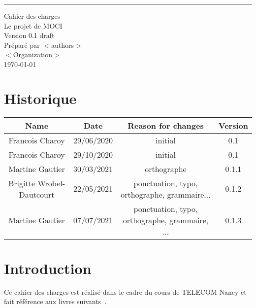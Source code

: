 \documentclass{scrreprt}
\date{}
\def\myversion{0.1 }
\begin{document}
\renewcommand*{\glsclearpage}{}
\begin{center}
    \rule{16cm}{5pt}\vskip1cm
    \begin{bfseries}
        \Huge{Cahier des charges}\\
        \vspace{1.9cm}
        Le projet de MOCI\\
        \vspace{1.9cm}
        \LARGE{Version \myversion draft}\\
        \vspace{1.9cm}
        Préparé par $<$authors$>$\\
        \vspace{1.9cm}
        $<$Organization$>$\\
        \vspace{1.9cm}
        \today\\
    \end{bfseries}
\end{center}

\tableofcontents

\chapter*{Historique}

\begin{center}
    \begin{tabular}{|c|c|c|c|}
        \hline
	    Name & Date & Reason for changes & Version\\
        \hline
	    Francois Charoy & 29/06/2020 & initial & 0.1\\
        \hline
	    Francois Charoy & 29/10/2020 & initial & 0.1\\
        \hline
	    Martine Gautier & 30/03/2021 & orthographe & 0.1.1\\
        \hline
        Brigitte Wrobel-Dautcourt & 22/05/2021 & ponctuation, typo, orthographe, grammaire... & 0.1.2\\
        \hline
        Martine Gautier & 07/07/2021 & ponctuation, typo, orthographe, grammaire, ... & 0.1.3\\
        \hline
    \end{tabular}
\end{center}

\chapter{Introduction}
Ce cahier des charges est réalisé dans le cadre du cours de TELECOM Nancy  et fait référence aux livres suivants~\cite{Sommerville:2010:SE:1841764,Pohl:2010:REF:1869735,Rumbaugh:2004:UML:993859}.
\end{document}
